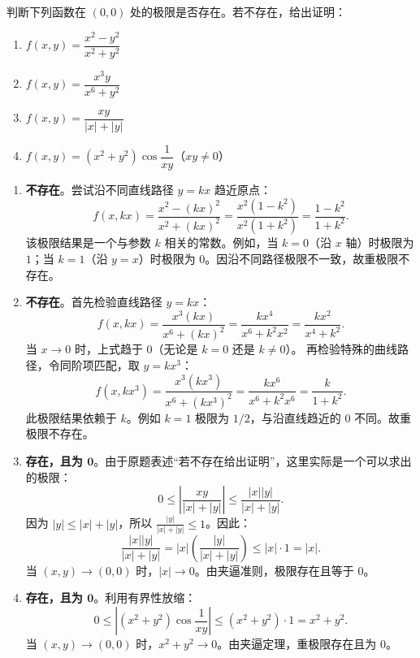 \documentclass[lang=cn,11pt]{elegantbook}
\begin{document}
\begin{exercise}[基础：极限存在性判定]
判断下列函数在 $(0,0)$ 处的极限是否存在。若不存在，给出证明：
\begin{enumerate}
  \item[(1)] $f(x,y)=\dfrac{x^2-y^2}{x^2+y^2}$
  \item[(2)] $f(x,y)=\dfrac{x^3y}{x^6+y^2}$
  \item[(3)] $f(x,y)=\dfrac{xy}{|x|+|y|}$
  \item[(4)] $f(x,y)=(x^2+y^2)\cos\dfrac{1}{xy}$（$xy \neq 0$）
\end{enumerate}
\end{exercise}
\begin{solution}
\begin{enumerate}
  \item[(1)] \textbf{不存在}。尝试沿不同直线路径 $y=kx$ 趋近原点：
  \[
  f(x,kx) = \frac{x^2-(kx)^2}{x^2+(kx)^2} = \frac{x^2(1-k^2)}{x^2(1+k^2)} = \frac{1-k^2}{1+k^2}.
  \]
  该极限结果是一个与参数 $k$ 相关的常数。例如，当 $k=0$（沿 $x$ 轴）时极限为 $1$；当 $k=1$（沿 $y=x$）时极限为 $0$。因沿不同路径极限不一致，故重极限不存在。

  \item[(2)] \textbf{不存在}。首先检验直线路径 $y=kx$：
  \[
  f(x,kx) = \frac{x^3(kx)}{x^6+(kx)^2} = \frac{kx^4}{x^6+k^2x^2} = \frac{kx^2}{x^4+k^2}.
  \]
  当 $x\to 0$ 时，上式趋于 $0$（无论是 $k=0$ 还是 $k\neq 0$）。
  再检验特殊的曲线路径，令同阶项匹配，取 $y=kx^3$：
  \[
  f(x,kx^3) = \frac{x^3(kx^3)}{x^6+(kx^3)^2} = \frac{kx^6}{x^6+k^2x^6} = \frac{k}{1+k^2}.
  \]
  此极限结果依赖于 $k$。例如 $k=1$ 极限为 $1/2$，与沿直线趋近的 $0$ 不同。故重极限不存在。

  \item[(3)] \textbf{存在，且为 $\boldsymbol{0}$}。由于原题表述“若不存在给出证明”，这里实际是一个可以求出的极限：
  \[
  0 \leqslant  \left|\frac{xy}{|x|+|y|}\right| \leqslant  \frac{|x||y|}{|x|+|y|}.
  \]
  因为 $|y| \leqslant  |x|+|y|$，所以 $\frac{|y|}{|x|+|y|} \leqslant  1$。因此：
  \[
  \frac{|x||y|}{|x|+|y|} = |x| \left(\frac{|y|}{|x|+|y|}\right) \leqslant  |x| \cdot 1 = |x|.
  \]
  当 $(x,y)\to(0,0)$ 时，$|x|\to 0$。由夹逼准则，极限存在且等于 $0$。

  \item[(4)] \textbf{存在，且为 $\boldsymbol{0}$}。利用有界性放缩：
  \[
  0 \leqslant  \left| (x^2+y^2)\cos\dfrac{1}{xy} \right| \leqslant  (x^2+y^2) \cdot 1 = x^2+y^2.
  \]
  当 $(x,y)\to(0,0)$ 时，$x^2+y^2 \to 0$。由夹逼定理，重极限存在且为 $0$。
\end{enumerate}
\end{solution}
\end{document}
